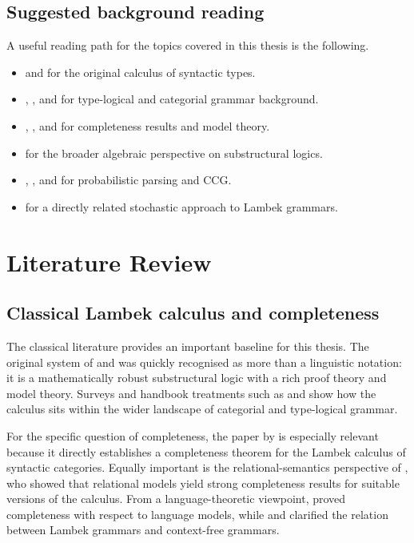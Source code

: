 \documentclass[12pt,a4paper]{report}
\theoremstyle{definition}
\begin{document}
\section{Suggested background reading}
A useful reading path for the topics covered in this thesis is the following.
\begin{itemize}
    \item \citet{Lambek1958} and \citet{Lambek1961} for the original calculus of syntactic types.
    \item \citet{vanBenthem1988}, \citet{Moortgat1997}, and \citet{Morrill1994} for type-logical and
    categorial grammar background.
    \item \citet{AndrekaMikulas1994}, \citet{Dosen1985}, and \citet{Pentus1995} for completeness
    results and model theory.
    \item \citet{GalatosJipsenKowalskiOno2007} for the broader algebraic perspective on substructural logics.
    \item \citet{ManningSchutze1999}, \citet{Steedman2000}, and \citet{ClarkCurran2007} for
    probabilistic parsing and CCG.
    \item \citet{BonfanteDeGroote2004} for a directly related stochastic approach to Lambek
    grammars.
\end{itemize}

\chapter{Literature Review}

\section{Classical Lambek calculus and completeness}
The classical literature provides an important baseline for this thesis. The original system of
\citet{Lambek1958} and \citet{Lambek1961} was quickly recognised as more than a linguistic
notation: it is a mathematically robust substructural logic with a rich proof theory and model
theory. Surveys and handbook treatments such as \citet{vanBenthem1988} and
\citet{Moortgat1997} show how the calculus sits within the wider landscape of categorial and
type-logical grammar.

For the specific question of completeness, the paper by \citet{Dosen1985} is especially relevant
because it directly establishes a completeness theorem for the Lambek calculus of syntactic
categories. Equally important is the relational-semantics perspective of
\citet{AndrekaMikulas1994}, who showed that relational models yield strong completeness results
for suitable versions of the calculus. From a language-theoretic viewpoint, \citet{Pentus1995}
proved completeness with respect to language models, while \citet{Pentus1993} and
\citet{Pentus1997} clarified the relation between Lambek grammars and context-free grammars.
\end{document}
